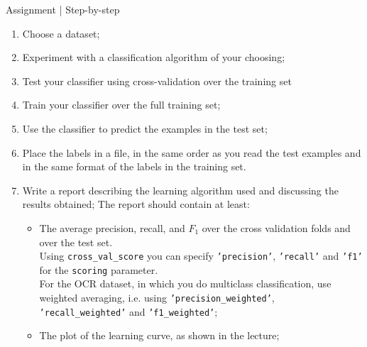 \documentclass{beamer}
\begin{document}
\begin{frame}{Assignment | Step-by-step}

\begin{enumerate}
\item Choose a dataset;
\item Experiment with a classification algorithm of your choosing;
\item Test your classifier using cross-validation over the training set
\item Train your classifier over the full training set;
\item Use the classifier to predict the examples in the test set;
\item Place the labels in a file, in the same order as you read the test
      examples and in the same format of the labels in the training set.
\item Write a report describing the learning algorithm used and discussing the
results obtained; The report should contain at least:
    \begin{itemize}
    \item The average precision, recall, and $F_1$ over the cross validation folds
	    and over the test set. \\ Using
          \texttt{cross\_val\_score} you can specify \texttt{'precision'},
          \texttt{'recall'} and \texttt{'f1'} for the \texttt{scoring}
          parameter. \\ For the OCR dataset, in which you do multiclass
          classification, use weighted averaging, i.e. using
          \texttt{'precision\_weighted'}, \texttt{'recall\_weighted'} and
          \texttt{'f1\_weighted'}; 
    \item The plot of the learning curve, as shown in the lecture;
    \end{itemize}
\end{enumerate}

\end{frame}

\end{document}
